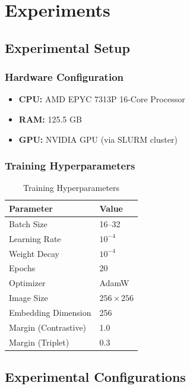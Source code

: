 \documentclass[12pt,a4paper]{article}
\begin{document}
\section{Experiments}
\label{sec:experiments}

\subsection{Experimental Setup}

\subsubsection{Hardware Configuration}

\begin{itemize}
    \item \textbf{CPU:} AMD EPYC 7313P 16-Core Processor
    \item \textbf{RAM:} 125.5 GB
    \item \textbf{GPU:} NVIDIA GPU (via SLURM cluster)
\end{itemize}

\subsubsection{Training Hyperparameters}

\begin{table}[H]
\centering
\caption{Training Hyperparameters}
\label{tab:hyperparameters}
\begin{tabular}{ll}
\toprule
\textbf{Parameter} & \textbf{Value} \\
\midrule
Batch Size & 16--32 \\
Learning Rate & $10^{-4}$ \\
Weight Decay & $10^{-4}$ \\
Epochs & 20 \\
Optimizer & AdamW \\
Image Size & $256 \times 256$ \\
Embedding Dimension & 256 \\
Margin (Contrastive) & 1.0 \\
Margin (Triplet) & 0.3 \\
\bottomrule
\end{tabular}
\end{table}

\subsection{Experimental Configurations}
\end{document}
